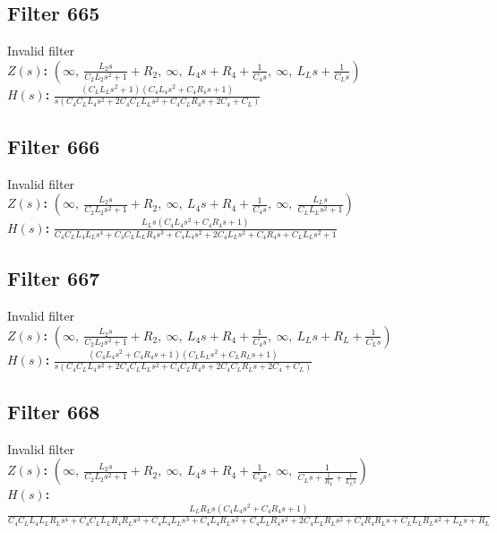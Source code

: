\documentclass{article}
\begin{document}
\subsection*{Filter 665}
Invalid filter \\ 
\textbf{$Z(s)$:} $\left( \infty, \  \frac{L_{2} s}{C_{2} L_{2} s^{2} + 1} + R_{2}, \  \infty, \  L_{4} s + R_{4} + \frac{1}{C_{4} s}, \  \infty, \  L_{L} s + \frac{1}{C_{L} s}\right)$ \\ 
\textbf{$H(s)$:} $\frac{\left(C_{L} L_{L} s^{2} + 1\right) \left(C_{4} L_{4} s^{2} + C_{4} R_{4} s + 1\right)}{s \left(C_{4} C_{L} L_{4} s^{2} + 2 C_{4} C_{L} L_{L} s^{2} + C_{4} C_{L} R_{4} s + 2 C_{4} + C_{L}\right)}$ \\ 
\subsection*{Filter 666}
Invalid filter \\ 
\textbf{$Z(s)$:} $\left( \infty, \  \frac{L_{2} s}{C_{2} L_{2} s^{2} + 1} + R_{2}, \  \infty, \  L_{4} s + R_{4} + \frac{1}{C_{4} s}, \  \infty, \  \frac{L_{L} s}{C_{L} L_{L} s^{2} + 1}\right)$ \\ 
\textbf{$H(s)$:} $\frac{L_{L} s \left(C_{4} L_{4} s^{2} + C_{4} R_{4} s + 1\right)}{C_{4} C_{L} L_{4} L_{L} s^{4} + C_{4} C_{L} L_{L} R_{4} s^{3} + C_{4} L_{4} s^{2} + 2 C_{4} L_{L} s^{2} + C_{4} R_{4} s + C_{L} L_{L} s^{2} + 1}$ \\ 
\subsection*{Filter 667}
Invalid filter \\ 
\textbf{$Z(s)$:} $\left( \infty, \  \frac{L_{2} s}{C_{2} L_{2} s^{2} + 1} + R_{2}, \  \infty, \  L_{4} s + R_{4} + \frac{1}{C_{4} s}, \  \infty, \  L_{L} s + R_{L} + \frac{1}{C_{L} s}\right)$ \\ 
\textbf{$H(s)$:} $\frac{\left(C_{4} L_{4} s^{2} + C_{4} R_{4} s + 1\right) \left(C_{L} L_{L} s^{2} + C_{L} R_{L} s + 1\right)}{s \left(C_{4} C_{L} L_{4} s^{2} + 2 C_{4} C_{L} L_{L} s^{2} + C_{4} C_{L} R_{4} s + 2 C_{4} C_{L} R_{L} s + 2 C_{4} + C_{L}\right)}$ \\ 
\subsection*{Filter 668}
Invalid filter \\ 
\textbf{$Z(s)$:} $\left( \infty, \  \frac{L_{2} s}{C_{2} L_{2} s^{2} + 1} + R_{2}, \  \infty, \  L_{4} s + R_{4} + \frac{1}{C_{4} s}, \  \infty, \  \frac{1}{C_{L} s + \frac{1}{R_{L}} + \frac{1}{L_{L} s}}\right)$ \\ 
\textbf{$H(s)$:} $\frac{L_{L} R_{L} s \left(C_{4} L_{4} s^{2} + C_{4} R_{4} s + 1\right)}{C_{4} C_{L} L_{4} L_{L} R_{L} s^{4} + C_{4} C_{L} L_{L} R_{4} R_{L} s^{3} + C_{4} L_{4} L_{L} s^{3} + C_{4} L_{4} R_{L} s^{2} + C_{4} L_{L} R_{4} s^{2} + 2 C_{4} L_{L} R_{L} s^{2} + C_{4} R_{4} R_{L} s + C_{L} L_{L} R_{L} s^{2} + L_{L} s + R_{L}}$ \\ 
\end{document}

